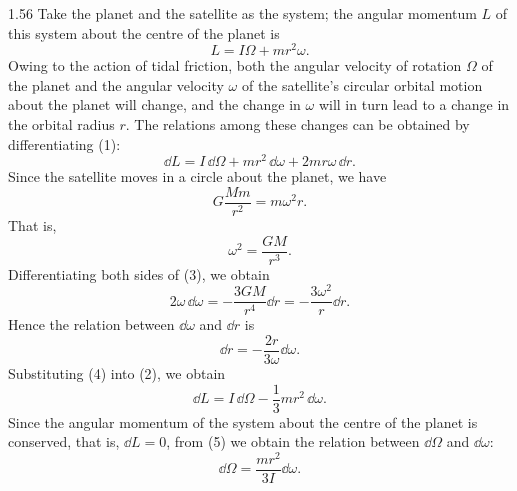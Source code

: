 \begin{solution}{1.56}
Take the planet and the satellite as the system; the angular momentum $L$ of this system about the centre of the planet is
\begin{equation}
L=I\Omega+mr^2\omega. \tag{1}
\end{equation}
Owing to the action of tidal friction, both the angular velocity of rotation $\Omega$ of the planet and the angular velocity $\omega$ of the satellite's circular orbital motion about the planet will change, and the change in $\omega$ will in turn lead to a change in the orbital radius $r$. The relations among these changes can be obtained by differentiating (1):
\begin{equation}
\dd L=I\,\dd\Omega+mr^2\,\dd\omega+2mr\omega\,\dd r. \tag{2}
\end{equation}
Since the satellite moves in a circle about the planet, we have
\[
G\frac{Mm}{r^2}=m\omega^2r.
\]
That is,
\begin{equation}
\omega^2=\frac{GM}{r^3}. \tag{3}
\end{equation}
Differentiating both sides of (3), we obtain
\[
2\omega\,\dd\omega=-\frac{3GM}{r^4}\dd r=-\frac{3\omega^2}{r}\dd r.
\]
Hence the relation between $\dd\omega$ and $\dd r$ is
\begin{equation}
\dd r=-\frac{2r}{3\omega}\dd\omega. \tag{4}
\end{equation}
Substituting (4) into (2), we obtain
\begin{equation}
\dd L=I\,\dd\Omega-\frac{1}{3}mr^2\,\dd\omega. \tag{5}
\end{equation}
Since the angular momentum of the system about the centre of the planet is conserved, that is, $\dd L=0$, from (5) we obtain the relation between $\dd\Omega$ and $\dd\omega$:
\begin{equation}
\dd\Omega=\frac{mr^2}{3I}\dd\omega. \tag{6}
\end{equation}


\end{solution}
